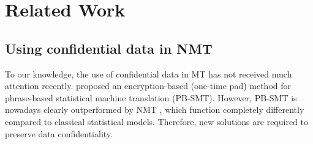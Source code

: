 \section{Related Work}






\subsection{Using confidential data in NMT}

To our knowledge, the use of confidential data in MT has not received much attention recently. \cite{cancedda-2012-private} proposed an encryption-based (one-time pad) method for phrase-based statistical machine translation (PB-SMT). However, PB-SMT is nowadays clearly outperformed by NMT \parencite{bentivogli-etal-2016-neural}, which function completely differently compared to classical statistical models. Therefore, new solutions are required to preserve data confidentiality. 

